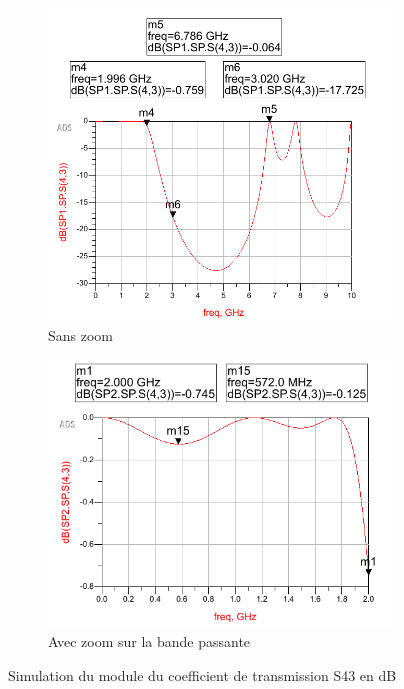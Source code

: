 \documentclass[french]{article}
\begin{document}
\begin{figure}[H]
	\centering
	\begin{subfigure}[b]{0.49\textwidth}
		\includegraphics[width=\textwidth]{photo/passe_bas_vic/simu_passe_bas_distribue.PNG}
		\caption{Sans zoom}
		\label{fig:simu_passe_bas_distribueG}
	\end{subfigure}
	\begin{subfigure}[b]{0.49\textwidth}
		\includegraphics[width=\textwidth]{photo/passe_bas_vic/simu_zoom_passe_bas_distribue.PNG}
		\caption{Avec zoom sur la bande passante}
		\label{fig:simu_zoom_passe_bas_distribue}
	\end{subfigure}
	\caption{Simulation du module du coefficient de transmission S43 en dB}
	\label{fig:simu_passe_bas_distribue}
\end{figure}
\end{document}
